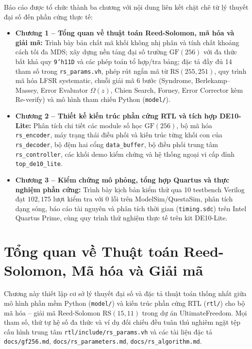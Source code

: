 \documentclass[12pt,a4paper]{report}
\begin{document}
Báo cáo được tổ chức thành ba chương với nội dung liên kết chặt chẽ từ lý thuyết đại số đến phần cứng thực tế:
\begin{itemize}
    \item \textbf{Chương 1 -- Tổng quan về thuật toán Reed-Solomon, mã hóa và giải mã:} Trình bày bản chất mã khối không nhị phân và tính chất khoảng cách tối đa MDS; xây dựng nền tảng đại số trường $\text{GF}(256)$ với đa thức bất khả quy \texttt{9'h11D} và các phép toán tổ hợp/tra bảng; đặc tả đầy đủ 14 tham số trong \texttt{rs\_params.vh}, phép rút ngắn mã từ $\text{RS}(255,251)$, quy trình mã hóa LFSR systematic, chuỗi giải mã 6 bước (Syndrome, Berlekamp--Massey, Error Evaluator $\Omega(z)$, Chien Search, Forney, Error Corrector kèm Re-verify) và mô hình tham chiếu Python (\texttt{model/}).
    \item \textbf{Chương 2 -- Thiết kế kiến trúc phần cứng RTL và tích hợp DE10-Lite:} Phân tích chi tiết các module số học $\text{GF}(256)$, bộ mã hóa \texttt{rs\_encoder}, máy trạng thái điều phối và kiến trúc từng khối con của \texttt{rs\_decoder}, bộ đệm hai cổng \texttt{data\_buffer}, bộ điều phối trung tâm \texttt{rs\_controller}, các khối demo kiểm chứng và hệ thống ngoại vi cấp đỉnh \texttt{top\_de10\_lite}.
    \item \textbf{Chương 3 -- Kiểm chứng mô phỏng, tổng hợp Quartus và thực nghiệm phần cứng:} Trình bày kịch bản kiểm thử qua 10 testbench Verilog đạt $102{,}175$ lượt kiểm tra với $0$ lỗi trên ModelSim/QuestaSim, phân tích dạng sóng, báo cáo tài nguyên và phân tích thời gian (\texttt{timing.sdc}) trên Intel Quartus Prime, cùng quy trình thử nghiệm thực tế trên kit DE10-Lite.
\end{itemize}

\tableofcontents
\listoftables
\listoffigures

\clearpage
{}

\chapter{Tổng quan về Thuật toán Reed-Solomon, Mã hóa và Giải mã}

Chương này thiết lập cơ sở lý thuyết đại số và đặc tả thuật toán thống nhất giữa mô hình phần mềm Python (\texttt{model/}) và kiến trúc phần cứng RTL (\texttt{rtl/}) cho bộ mã hóa -- giải mã Reed-Solomon $\text{RS}(15,11)$ trong dự án UltimateFreedom. Mọi tham số, thứ tự hệ số đa thức và ví dụ đối chiếu đều tuân thủ nghiêm ngặt tệp cấu hình trung tâm \texttt{rtl/include/rs\_params.vh} và các tài liệu đặc tả \texttt{docs/gf256.md}, \texttt{docs/rs\_parameters.md}, \texttt{docs/rs\_algorithm.md}.
\end{document}
